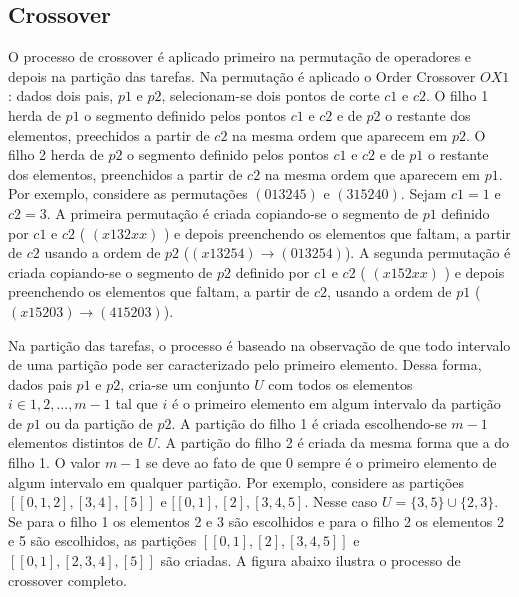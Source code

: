 \documentclass{article}
\begin{document}
\subsection{Crossover}

O processo de crossover é aplicado primeiro na permutação de operadores e depois na partição das tarefas. Na permutação é aplicado o  Order Crossover $OX1$ \cite{op}: dados dois pais, $p1$ e $p2$, selecionam-se dois pontos de corte $c1$ e $c2$. O  filho 1 herda de $p1$ o segmento definido pelos pontos $c1$ e $c2$ e de $p2$ o restante dos elementos, preechidos a partir de $c2$ na mesma ordem que aparecem em $p2$. O filho 2 herda de $p2$ o segmento definido pelos pontos $c1$ e $c2$ e de $p1$ o restante dos elementos, preenchidos a partir de $c2$ na mesma ordem que aparecem em $p1$. Por exemplo, considere as permutações $(0 1 3 2 4 5)$ e $(3 1 5 2 4 0)$. Sejam $c1 = 1 $ e $c2 = 3$. A primeira permutação é criada copiando-se o segmento  de $p1$ definido por $c1$ e $c2$ ( $(x 1 3 2 x x)$ ) e depois preenchendo os elementos que faltam, a partir de $c2$ usando a ordem de $p2$ ($(x 1 3 2 5 4) \rightarrow (0 1 3 2 5 4)$). A segunda permutação é criada copiando-se o segmento  de $p2$ definido por $c1$ e $c2$ ( $(x 1 5 2 x x)$ ) e depois preenchendo os elementos que faltam, a partir de $c2$, usando a ordem de $p1$ ($(x 1 5 2 0 3) \rightarrow (4 1 5 2 0 3)$). 
\par
Na partição das tarefas, o processo é baseado na observação de que todo intervalo de uma partição pode ser caracterizado pelo primeiro elemento. Dessa forma, dados pais $p1$ e $p2$, cria-se um conjunto $U$ com todos os elementos $i \in {1, 2,..., m-1}$ tal que $i$ é o primeiro elemento em algum intervalo da partição de $p1$ ou da partição de $p2$. A partição do filho 1 é criada escolhendo-se $m-1$ elementos distintos de $U$. A partição do filho 2 é criada da mesma forma que a do filho 1. O valor $m-1$ se deve ao fato de que 0 sempre é o primeiro elemento de algum intervalo em qualquer partição. Por exemplo, considere as partições $[[0, 1, 2], [3, 4], [5]]$ e $[[0, 1], [2], [3, 4, 5]$. Nesse caso $U = \{3, 5\} \cup \{2, 3\}$. Se para o filho 1 os elementos 2 e 3  são escolhidos e para o filho 2 os elementos 2 e 5 são escolhidos, as partições $[[0, 1], [2], [3, 4, 5]]$ e $[[0, 1], [2, 3, 4], [5]]$ são criadas. A figura abaixo ilustra o processo de crossover completo.
\end{document}
